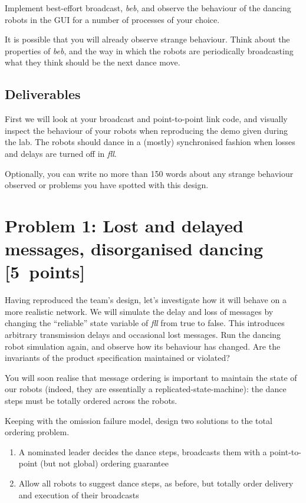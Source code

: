 \documentclass[a4paper]{article}
\begin{document}
Implement best-effort broadcast, \emph{beb}, and observe the behaviour of the
dancing robots in the GUI for a number of processes of your choice.

It is possible that you will already observe strange behaviour. Think about
the properties of \emph{beb}, and the way in which the robots are periodically
broadcasting what they think should be the next dance move.

\subsection*{Deliverables} %
\label{sub:p0_deliverables}

First we will look at your broadcast and point-to-point link code, and
visually inspect the behaviour of your robots when reproducing the demo given
during the lab. The robots should dance in a (mostly) synchronised fashion
when losses and delays are turned off in \emph{fll}.

Optionally, you can write no more than 150 words about any strange behaviour
observed or problems you have spotted with this design.





\section*{Problem 1: Lost and delayed messages, disorganised dancing [5~points]} %
\label{sec:dealing_with_unreliable_links}

Having reproduced the team's design, let's investigate how it will behave on
a more realistic network. We will simulate the delay and loss of messages by
changing the ``reliable'' state variable of \emph{fll} from true to false.
This introduces arbitrary transmission delays and occasional lost messages.
Run the dancing robot  simulation again, and observe how its behaviour has
changed. Are the invariants of the product specification maintained or
violated?

You will soon realise that message ordering is important to maintain the state
of our robots (indeed, they are essentially a replicated-state-machine): the
dance steps must be totally ordered across the robots.

Keeping with the omission failure model, design two solutions to the total
ordering problem.
\begin{enumerate}

  \item A nominated leader decides the dance steps, broadcasts them with a
  point-to-point (but not global) ordering guarantee

  \item Allow all robots to suggest dance steps, as before, but totally order
  delivery and execution of their broadcasts

\end{enumerate}
\end{document}
